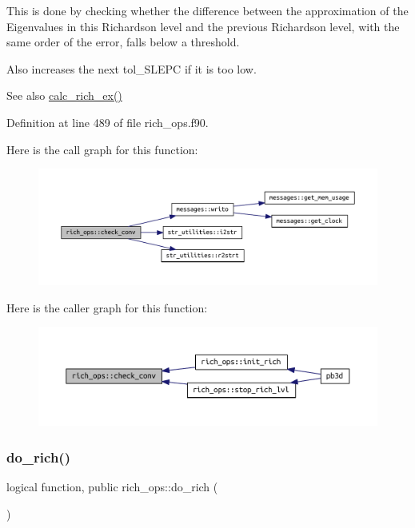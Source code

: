 This is done by checking whether the difference between the approximation of the Eigenvalues in this Richardson level and the previous Richardson level, with the same order of the error, falls below a threshold.

Also increases the next tol\+\_\+\+S\+L\+E\+PC if it is too low.

\begin{DoxySeeAlso}{See also}
\hyperlink{namespacerich__ops_ad2717df0206a397d0d7845a96aa5da23}{calc\+\_\+rich\+\_\+ex()} 
\end{DoxySeeAlso}


Definition at line 489 of file rich\+\_\+ops.\+f90.

Here is the call graph for this function\+:\nopagebreak
\begin{figure}[H]
\begin{center}
\leavevmode
\includegraphics[width=350pt]{namespacerich__ops_ac00cce686d45540b238b3b6e39c9bdeb_cgraph}
\end{center}
\end{figure}
Here is the caller graph for this function\+:\nopagebreak
\begin{figure}[H]
\begin{center}
\leavevmode
\includegraphics[width=350pt]{namespacerich__ops_ac00cce686d45540b238b3b6e39c9bdeb_icgraph}
\end{center}
\end{figure}
\mbox{\label{namespacerich__ops_a50f4088b9ddd59597987fb4112f2a73e}} 
\subsubsection{\texorpdfstring{do\+\_\+rich()}{do\_rich()}}
{\footnotesize\ttfamily logical function, public rich\+\_\+ops\+::do\+\_\+rich (\begin{DoxyParamCaption}{ }\end{DoxyParamCaption})}



